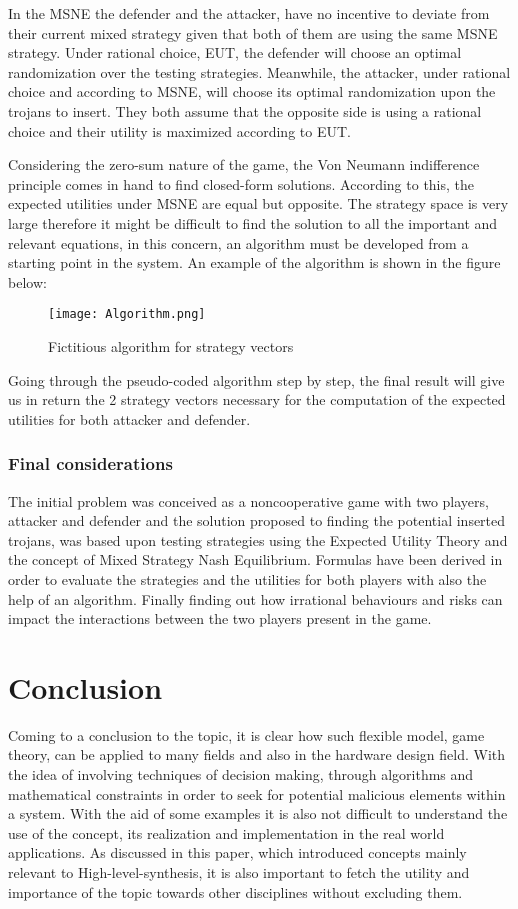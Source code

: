 \documentclass[conference]{IEEEtran}
\begin{document}
{{In the MSNE the defender and the attacker, have no incentive to deviate from their current mixed strategy given that both of them are using the same MSNE strategy. Under rational choice, EUT, the defender will choose an optimal randomization over the testing strategies. Meanwhile, the attacker, under rational choice and according to MSNE, will choose its optimal randomization upon the trojans to insert. They both assume that the opposite side is using a rational choice and their utility is maximized according to EUT.

Considering the zero-sum nature of the game, the Von Neumann indifference principle comes in hand to find closed-form solutions. According to this, the expected utilities under MSNE are equal but opposite. The strategy space is very large therefore it might be difficult to find the solution to all the important and relevant equations, in this concern, an algorithm must be developed from a starting point in the system. An example of the algorithm is shown in the figure below:
\begin{figure}[h]
    \centerline{\texttt{[image: Algorithm.png]}}
    \caption{Fictitious algorithm for strategy vectors \cite{b10}}
    \label{algo}
\end{figure} 

Going through the pseudo-coded algorithm step by step, the final result will give us in return the 2 strategy vectors necessary for the computation of the expected utilities for both attacker and defender.

\subsubsection{Final considerations}
The initial problem was conceived as a noncooperative game with two players, attacker and defender and the solution proposed to finding the potential inserted trojans, was based upon testing strategies using the Expected Utility Theory and the concept of Mixed Strategy Nash Equilibrium.
Formulas have been derived in order to evaluate the strategies and the utilities for both players with also the help of an algorithm. Finally finding out how irrational behaviours and risks can impact the interactions between the two players present in the game.

\section{Conclusion}
Coming to a conclusion to the topic, it is clear how such flexible model, game theory, can be applied to many fields and also in the hardware design field. With the idea of involving techniques of decision making, through algorithms and mathematical constraints in order to seek for potential malicious elements within a system. With the aid of some examples it is also not difficult to understand the use of the concept, its realization and implementation in the real world applications. As discussed in this paper, which introduced concepts mainly relevant to High-level-synthesis, it is also important to fetch the utility and importance of the topic towards other disciplines without excluding them.



}}
\end{document}
